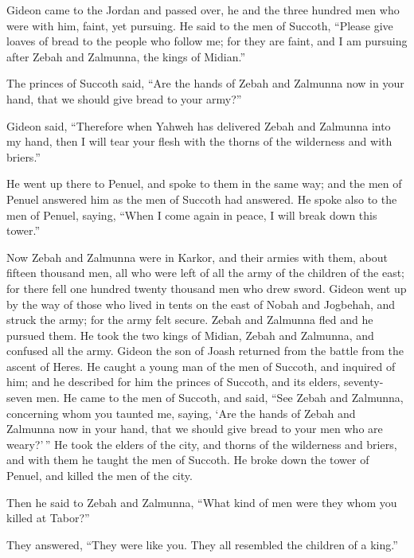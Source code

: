  Gideon came to the Jordan and passed over, he and the
three hundred men who were with him, faint, yet pursuing. 
He said to the men of Succoth, ``Please give loaves of bread to the
people who follow me; for they are faint, and I am pursuing after Zebah
and Zalmunna, the kings of Midian.''

 The princes of Succoth said, ``Are the hands of Zebah and
Zalmunna now in your hand, that we should give bread to your army?''

 Gideon said, ``Therefore when Yahweh has delivered Zebah
and Zalmunna into my hand, then I will tear your flesh with the thorns
of the wilderness and with briers.''

 He went up there to Penuel, and spoke to them in the same
way; and the men of Penuel answered him as the men of Succoth had
answered.  He spoke also to the men of Penuel, saying,
``When I come again in peace, I will break down this tower.''

 Now Zebah and Zalmunna were in Karkor, and their armies
with them, about fifteen thousand men, all who were left of all the army
of the children of the east; for there fell one hundred twenty thousand
men who drew sword.  Gideon went up by the way of those
who lived in tents on the east of Nobah and Jogbehah, and struck the
army; for the army felt secure.  Zebah and Zalmunna fled
and he pursued them. He took the two kings of Midian, Zebah and
Zalmunna, and confused all the army.  Gideon the son of
Joash returned from the battle from the ascent of Heres. 
He caught a young man of the men of Succoth, and inquired of him; and he
described for him the princes of Succoth, and its elders, seventy-seven
men.  He came to the men of Succoth, and said, ``See
Zebah and Zalmunna, concerning whom you taunted me, saying, `Are the
hands of Zebah and Zalmunna now in your hand, that we should give bread
to your men who are weary?'\,''  He took the elders of
the city, and thorns of the wilderness and briers, and with them he
taught the men of Succoth.  He broke down the tower of
Penuel, and killed the men of the city.

 Then he said to Zebah and Zalmunna, ``What kind of men
were they whom you killed at Tabor?''

They answered, ``They were like you. They all resembled the children of
a king.''

